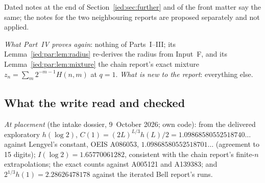 \documentclass[11pt,letterpaper]{article}
\theoremstyle{remark}\newtheorem{remark}[theorem]{Remark}
\begin{document}
Dated notes at the end of Section~\ref{ied:sec:further} and of the front
matter say the same; the notes for the two neighbouring reports are proposed
separately and not applied.

\emph{What Part~IV proves again}: nothing of Parts~I--III; its Lemma~\ref{ied:par:lem:radius}
re-derives the radius from Input~F, and its Lemma~\ref{ied:par:lem:mixture}
the chain report's exact mixture $z_n=\sum_m2^{-m-1}H(n,m)$ at $q=1$.
\emph{What is new to the report}: everything else.

\subsection{What the write read and checked}\label{ied:par:sec:checks}

\emph{At placement} (the intake dossier, 9~October 2026; own code): from the
delivered exploratory $h(\log2)$, $C(1)=(2L)^{L/3}h(L)/2=1.09868580552518740\ldots$
against Lengyel's constant, OEIS A086053, $1.09868580552518701\ldots$ (agreement
to 15 digits); $I(\log2)=1.65770061282$, consistent with the chain report's
finite-$n$ extrapolations; the exact counts against A005121 and A139383; and
$2^{1/3}h(1)=2.28626478178$ against the iterated Bell report's runs.
\end{document}
